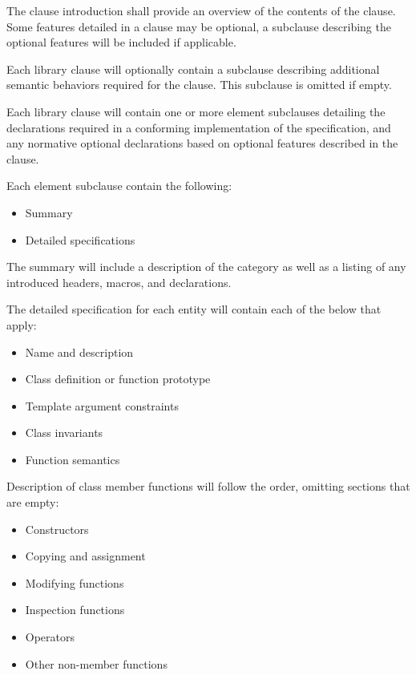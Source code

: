 \p The clause introduction shall provide an overview of the contents of the
clause. Some features detailed in a clause may be optional, a subclause
describing the optional features will be included if applicable.

\p Each library clause will optionally contain a subclause describing additional
semantic behaviors required for the clause. This subclause is omitted if empty.

\p Each library clause will contain one or more element subclauses detailing the
declarations required in a conforming implementation of the specification, and
any normative optional declarations based on optional features described in the
clause.


\p Each element subclause contain the following:

\begin{itemize}
  \item Summary
  \item Detailed specifications
\end{itemize}


\p The summary will include a description of the category as well as a listing
of any introduced headers, macros, and declarations.


\p The detailed specification for each entity will contain each of the below
that apply:

\begin{itemize}
  \item Name and description
  \item Class definition or function prototype
  \item Template argument constraints
  \item Class invariants
  \item Function semantics
\end{itemize}

\p Description of class member functions will follow the order, omitting
sections that are empty:

\begin{itemize}
  \item Constructors
  \item Copying and assignment
  \item Modifying functions
  \item Inspection functions
  \item Operators
  \item Other non-member functions
\end{itemize}

